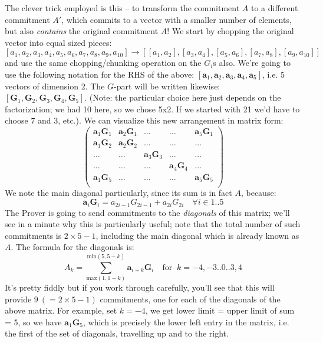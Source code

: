 \documentclass[10pt,a4paper]{article}
\begin{document}
The clever trick employed is this -- to transform the commitment $A$ to a
different commitment $A'$, which commits to a vector with a smaller number
of elements, but also \emph{contains} the original commitment $A$! We start
by chopping the original vector into equal sized pieces:
\[[a_1, a_2, a_3, a_4, a_5, a_6, a_7, a_8, a_9, a_{10}] \rightarrow [[a_1, a_2], [a_3, a_4], [a_5, a_6], [a_7, a_8], [a_9, a_{10}]]\]
and use the same chopping/chunking operation on the $G_i$s also. We're going
to use the following notation for the RHS of the above: $[\textbf{a}_1, \textbf{a}_2, \textbf{a}_3, \textbf{a}_4, \textbf{a}_5]$, i.e. 5 vectors
of dimension 2. The $G$-part will be written likewise: $[\textbf{G}_1, \textbf{G}_2, \textbf{G}_3, \textbf{G}_4, \textbf{G}_5]$. (Note: the
particular choice here just depends on the factorization; we had 10
here, so we chose 5x2. If we started with 21 we'd have to choose 7 and
3, etc.). We can visualize this new arrangement in matrix form:
\[
\begin{pmatrix}
\textbf{a}_1\textbf{G}_1 & \textbf{a}_2\textbf{G}_1 & \dots & \dots & \textbf{a}_5\textbf{G}_1 \\
\textbf{a}_1\textbf{G}_2 &  \textbf{a}_2\textbf{G}_2& \dots & \dots & \dots \\
\dots & \dots & \textbf{a}_3\textbf{G}_3 & \dots & \dots \\
\dots & \dots & \dots & \textbf{a}_4\textbf{G}_4 & \dots  \\
\textbf{a}_1\textbf{G}_5 & \dots & \dots & \dots & \textbf{a}_5\textbf{G}_5 \\
\end{pmatrix}
\]
We note the main diagonal particularly, since its sum is in fact $A$,
because:
\[\textbf{a}_i \textbf{G}_i = a_{2i-1} G_{2i-1} + a_{2i}G_{2i} \quad \forall i \in 1..5\]
The Prover is going to send commitments to the \emph{diagonals} of this
matrix; we'll see in a minute why this is particularly useful; note that
the total number of such commitments is $2\times 5 -1$, including the main
diagonal which is already known as $A$. The formula for the diagonals is:
\[A_k = \sum\limits_{\textrm{max}(1, 1-k)}^{\textrm{min}(5, 5-k)} \textbf{a}_{i+k}\textbf{G}_i \quad \textrm{for }\ k=-4,-3..0..3,4\]
It's pretty fiddly but if you work through carefully, you'll see that
this will provide $9\ (= 2\times 5 -1)$ commitments, one for each of the
diagonals of the above matrix. For example, set $k=-4$, we get
lower limit = upper limit of sum = 5, so we have $\mathbf{a}_1\mathbf{G}_5$, which is precisely
the lower left entry in the matrix, i.e. the first of the set of
diagonals, travelling up and to the right.
\end{document}

